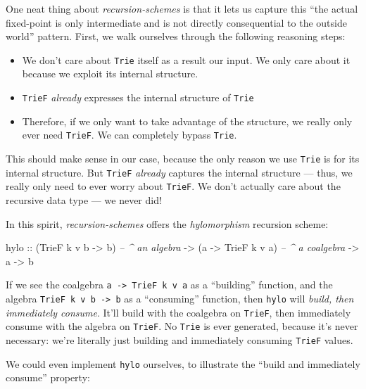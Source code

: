 \documentclass[]{article}
\newenvironment{Shaded}{}{}
\newcommand{\CommentTok}[1]{\textcolor[rgb]{0.38,0.63,0.69}{\textit{#1}}}
\newcommand{\DataTypeTok}[1]{\textcolor[rgb]{0.56,0.13,0.00}{#1}}
\newcommand{\NormalTok}[1]{#1}
\newcommand{\OtherTok}[1]{\textcolor[rgb]{0.00,0.44,0.13}{#1}}
\begin{document}
One neat thing about \emph{recursion-schemes} is that it lets us capture this
``the actual fixed-point is only intermediate and is not directly consequential
to the outside world'' pattern. First, we walk ourselves through the following
reasoning steps:

\begin{itemize}
\tightlist
\item
  We don't care about \texttt{Trie} itself as a result our input. We only care
  about it because we exploit its internal structure.
\item
  \texttt{TrieF} \emph{already} expresses the internal structure of
  \texttt{Trie}
\item
  Therefore, if we only want to take advantage of the structure, we really only
  ever need \texttt{TrieF}. We can completely bypass \texttt{Trie}.
\end{itemize}

This should make sense in our case, because the only reason we use \texttt{Trie}
is for its internal structure. But \texttt{TrieF} \emph{already} captures the
internal structure --- thus, we really only need to ever worry about
\texttt{TrieF}. We don't actually care about the recursive data type --- we
never did!

In this spirit, \emph{recursion-schemes} offers the \emph{hylomorphism}
recursion scheme:

\begin{Shaded}
\begin{Highlighting}[]
\NormalTok{hylo}
\OtherTok{    ::}\NormalTok{ (}\DataTypeTok{TrieF}\NormalTok{ k v b }\OtherTok{->}\NormalTok{ b)   }\CommentTok{-- ^ an algebra}
    \OtherTok{->}\NormalTok{ (a }\OtherTok{->} \DataTypeTok{TrieF}\NormalTok{ k v a)   }\CommentTok{-- ^ a coalgebra}
    \OtherTok{->}\NormalTok{ a}
    \OtherTok{->}\NormalTok{ b}
\end{Highlighting}
\end{Shaded}

If we see the coalgebra \texttt{a\ -\textgreater{}\ TrieF\ k\ v\ a} as a
``building'' function, and the algebra
\texttt{TrieF\ k\ v\ b\ -\textgreater{}\ b} as a ``consuming'' function, then
\texttt{hylo} will \emph{build, then immediately consume}. It'll build with the
coalgebra on \texttt{TrieF}, then immediately consume with the algebra on
\texttt{TrieF}. No \texttt{Trie} is ever generated, because it's never
necessary: we're literally just building and immediately consuming
\texttt{TrieF} values.

We could even implement \texttt{hylo} ourselves, to illustrate the ``build and
immediately consume'' property:
\end{document}
